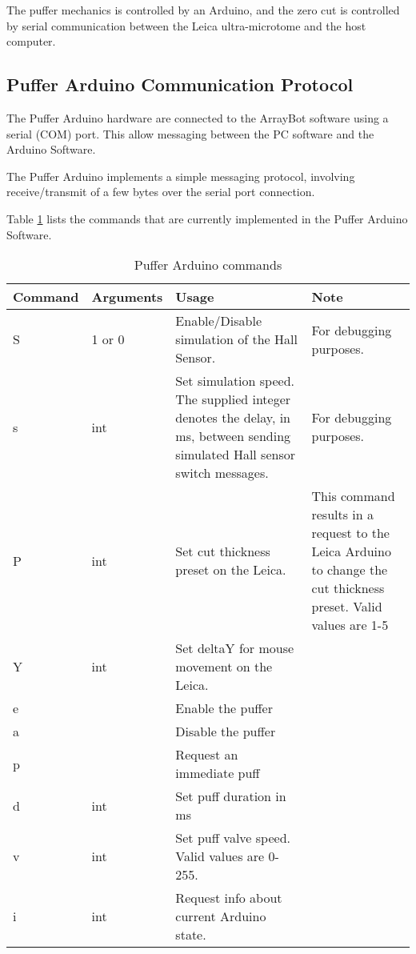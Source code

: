 \documentclass[11pt,fleqn]{book} %
\begin{document}
The puffer mechanics is controlled by an Arduino, and the zero cut is controlled by serial communication between the Leica ultra-microtome and the host computer.


\subsection{Puffer Arduino Communication Protocol}
The Puffer Arduino hardware are connected to the ArrayBot software using a serial (COM) port. This allow messaging between the PC software and  the Arduino Software. 

The Puffer Arduino implements a simple messaging protocol, involving receive/transmit of a few bytes over the serial port connection.

Table \ref{tab:pac} lists the commands that are currently implemented in the Puffer Arduino Software.

\begin{table}[h]
\centering
\begin{tabular}{l l p{160pt} p{160pt}}
\toprule
\textbf{Command} & \textbf{Arguments} & \textbf{Usage} & \textbf{Note}\\
\midrule
S	& 1 or 0	& Enable/Disable simulation of the Hall Sensor. & For debugging purposes. \\
s	& int		& Set simulation speed. The supplied integer denotes the delay, in ms, between sending simulated Hall sensor switch messages. & For debugging purposes. \\
P	& int	& Set cut thickness preset on the Leica. &  This command results in a request to the Leica Arduino to change the cut thickness preset. Valid values are 1-5\\
Y	& int	& Set deltaY for mouse movement on the Leica. &  \\
e	&   & Enable the puffer &  \\
a	&   & Disable the puffer &  \\
p	&   & Request an immediate puff &  \\
d	& int   & Set puff duration in ms &  \\
v	& int   & Set puff valve speed. Valid values are 0-255. &  \\
i	& int   & Request info about current Arduino state. &  \\
\bottomrule
\end{tabular}
\caption{Puffer Arduino commands}\label{tab:pac}
\end{table}
\end{document}
